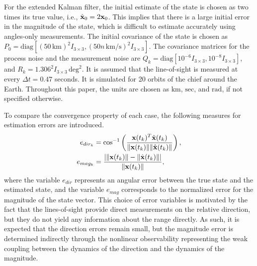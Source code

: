 For the extended Kalman filter, the initial estimate of the state is chosen as two times its true value, i.e., $\hat{\mathbf{x}}_0=2\mathbf{x}_0$. This implies that there is a large initial error in the magnitude of the state, which is difficult to estimate accurately using angles-only measurements. The initial covariance of the state is chosen as $P_0=\mathrm{diag}[(50\,\mathrm{km})^2I_{3\times 3}, (50n\,\mathrm{km/s})^2I_{3\times 3}]$. The covariance matrices for the process noise and the measurement noise are $Q_k=\mathrm{diag}[10^{-6}I_{3\times 3}, 10^{-8}I_{3\times 3}]$, and $R_k=1.306^2 I_{3\times 3}\,\mathrm{deg}^2$. It is assumed that the line-of-sight is measured at every $\Delta t = 0.47$ seconds. It is simulated for 20 orbits of the chief around the Earth. Throughout this paper, the units are chosen as $\mathrm{km}$, $\mathrm{sec}$, and $\mathrm{rad}$, if not specified otherwise. 

To compare the convergence property of each case, the following measures for estimation errors are introduced.
\begin{align*}
e_{dir_k}  & = \cos^{-1}\left( \frac{\mathbf{x}(t_k)^T \hat{\mathbf{x}} (t_k)}
{\|\mathbf{x}(t_k)\| \|\hat{\mathbf{x}} (t_k)\|} \right),\\
e_{mag_k}  & = 
\frac{|\|\mathbf{x}(t_k)\|-\|\hat{\mathbf{x}} (t_k)\||}{\|\mathbf{x}(t_k)\|},
\end{align*}
where the variable $e_{dir}$ represents an angular error between the true state and the estimated state, and the variable $e_{mag}$ corresponds to the normalized error for the magnitude of the state vector. This choice of error variables is motivated by the fact that the lines-of-sight provide direct measurements on the relative direction, but they do not yield any information about the range directly. As such, it is expected that the direction errors remain small, but the magnitude error is determined indirectly through the nonlinear observability representing the weak coupling between the dynamics of the direction and the dynamics of the magnitude. 

